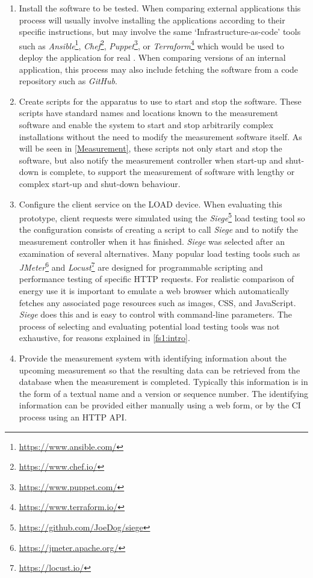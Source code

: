 \begin{enumerate}

\item  Install the software to be tested. When comparing external applications this process will usually involve installing the applications according to their specific instructions, but may involve the same `Infrastructure-as-code' tools such as \emph{Ansible}\footnote{\url{https://www.ansible.com/}}, \emph{Chef}\footnote{\url{https://www.chef.io/}}, \emph{Puppet}\footnote{\url{https://www.puppet.com/}}, or \emph{Terraform}\footnote{\url{https://www.terraform.io/}} which would be used to deploy the application for real \citep{Rahman2019}. When comparing versions of an internal application, this process may also include fetching the software from a code repository such as \emph{GitHub}.

\item Create scripts for the apparatus to use to start and stop the software. These scripts have standard names and locations known to the measurement software and enable the system to start and stop arbitrarily complex installations without the need to modify the measurement software itself. As will be seen in \autoref{Measurement}, these scripts not only start and stop the software, but also notify the measurement controller when start-up and shut-down is complete, to support the measurement of software with lengthy or complex start-up and shut-down behaviour.

\item Configure the client service on the LOAD device. When evaluating this prototype, client requests were simulated using the \emph{Siege}\footnote{\url{https://github.com/JoeDog/siege}} load testing tool so the configuration consists of creating a script to call \emph{Siege} and to notify the measurement controller when it has finished. \emph{Siege} was selected after an examination of several alternatives. Many popular load testing tools such as \emph{JMeter}\footnote{\url{https://jmeter.apache.org/}} and \emph{Locust}\footnote{\url{https://locust.io/}} are designed for programmable scripting and performance testing of specific HTTP requests. For realistic comparison of energy use it is important to emulate a web browser which automatically fetches any associated page resources such as images, CSS, and JavaScript. \emph{Siege} does this and is easy to control with command-line parameters. The process of selecting and evaluating potential load testing tools was not exhaustive, for reasons explained in \autoref{fs1:intro}.

\item Provide the measurement system with identifying information about the upcoming measurement so that the resulting data can be retrieved from the database when the measurement is completed. Typically this information is in the form of a textual name and a version or sequence number. The identifying information can be provided either manually using a web form, or by the CI process using an HTTP API.

\end{enumerate}

